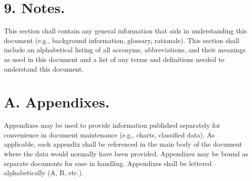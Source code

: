 \section{9. Notes.}

This section shall contain any general information that aids in
understanding this document (e.g., background information, glossary,
rationale). This section shall include an alphabetical listing of all
acronyms, abbreviations, and their meanings as used in this document and
a list of any terms and definitions needed to understand this document.

\section{A. Appendixes.}

Appendixes may be used to provide information published separately for
convenience in document maintenance (e.g., charts, classified data). As
applicable, each appendix shall be referenced in the main body of the
document where the data would normally have been provided. Appendixes
may be bound as separate documents for ease in handling. Appendixes
shall be lettered alphabetically (A, B, etc.).
